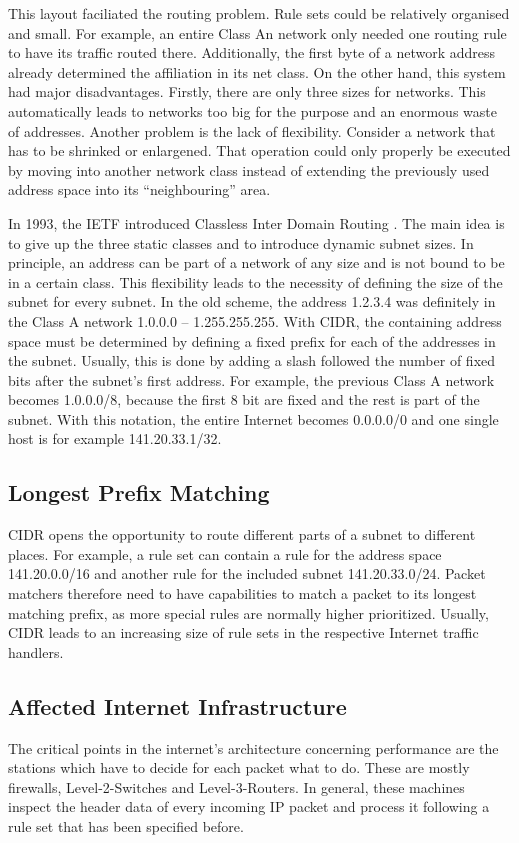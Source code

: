 \documentclass[a4paper,
		12pt,
		parskip=full,
		titlepage
		]{scrartcl}
\begin{document}
This layout faciliated the routing problem.
Rule sets could be relatively organised and small.
For example, an entire Class An network only needed one routing rule to have its traffic routed there.
Additionally, the first byte of a network address already determined the affiliation in its net class.
On the other hand, this system had major disadvantages.
Firstly, there are only three sizes for networks.
This automatically leads to networks too big for the purpose and an enormous waste of addresses.
Another problem is the lack of flexibility.
Consider a network that has to be shrinked or enlargened.
That operation could only properly be executed by moving into another network class instead of extending the 
previously used address space into its \enquote{neighbouring} area.

In 1993, the IETF introduced Classless Inter Domain Routing\cite{rfc1518} \cite{rfc4632}.
The main idea is to give up the three static classes and to introduce dynamic subnet sizes.
In principle, an address can be part of a network of any size and is not bound to be in a certain class.
This flexibility leads to the necessity of defining the size of the subnet for every subnet.
In the old scheme, the address 1.2.3.4 was definitely in the Class A network 1.0.0.0 -- 1.255.255.255.
With CIDR, the containing address space must be determined by defining a fixed prefix for each of the addresses in the subnet.
Usually, this is done by adding a slash followed the number of fixed bits after the subnet's first address.
For example, the previous Class A network becomes 1.0.0.0/8, because the first 8 bit are fixed and the rest is part of the subnet.
With this notation, the entire Internet becomes 0.0.0.0/0 and one single host is for example 141.20.33.1/32.

\subsection{Longest Prefix Matching}
CIDR opens the opportunity to route different parts of a subnet to different places.
For example, a rule set can contain a rule for the address space 141.20.0.0/16 and another rule for the included subnet 141.20.33.0/24.
Packet matchers therefore need to have capabilities to match a packet to its longest matching prefix, as more special rules are normally higher prioritized.
Usually, CIDR leads to an increasing size of rule sets in the respective Internet traffic handlers. 

\subsection{Affected Internet Infrastructure}
The critical points in the internet's architecture concerning performance are the stations which have to decide for each packet what to do.
These are mostly firewalls, Level-2-Switches and Level-3-Routers.
In general, these machines inspect the header data of every incoming IP packet and process it following a rule set that has been specified before.
\end{document}

